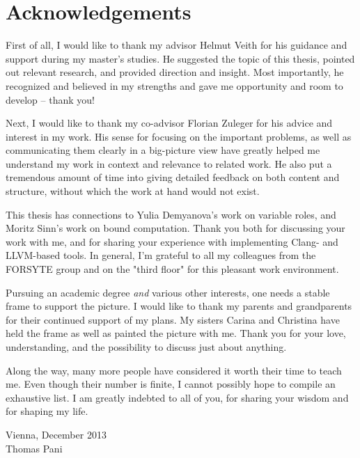 \chapter*{Acknowledgements}

First of all, I would like to thank my advisor Helmut Veith for his guidance and support during my master's studies. He suggested the topic of this thesis, pointed out relevant research, and provided direction and insight. Most importantly, he recognized and believed in my strengths and gave me opportunity and room to develop – thank you!

Next, I would like to thank my co-advisor Florian Zuleger for his advice and interest in my work. His sense for focusing on the important problems, as well as communicating them clearly in a big-picture view have greatly helped me understand my work in context and relevance to related work. He also put a tremendous amount of time into giving detailed feedback on both content and structure, without which the work at hand would not exist.

This thesis has connections to Yulia Demyanova's work on variable roles, and Moritz Sinn's work on bound computation. Thank you both for discussing your work with me, and for sharing your experience with implementing Clang- and LLVM-based tools. In general, I'm grateful to all my colleagues from the FORSYTE group and on the "third floor" for this pleasant work environment.

Pursuing an academic degree \emph{and} various other interests, one needs a stable frame to support the picture. I would like to thank my parents and grandparents for their continued support of my plans. My sisters Carina and Christina have held the frame as well as painted the picture with me. Thank you for your love, understanding, and the possibility to discuss just about anything.

Along the way, many more people have considered it worth their time to teach me. Even though their number is finite, I cannot possibly hope to compile an exhaustive list. I am greatly indebted to all of you, for sharing your wisdom and for shaping my life.

\vspace{3em}

\begin{flushright}
Vienna, December 2013\\
Thomas Pani
\end{flushright}

